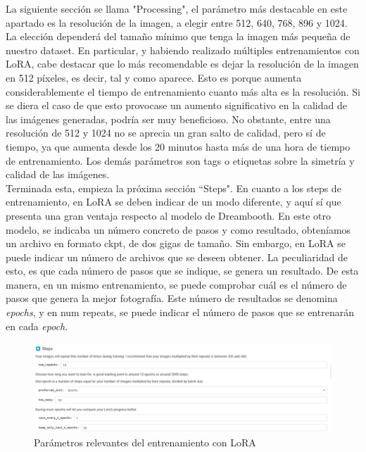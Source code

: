 La siguiente sección se llama "Processing", el parámetro más destacable en este apartado es la resolución de la imagen, a elegir entre 512, 640, 768, 896 y 1024. La elección dependerá del tamaño mínimo que tenga la imagen más pequeña de nuestro dataset.  En particular, y habiendo realizado múltiples entrenamientos con LoRA, cabe destacar que lo más recomendable es dejar la resolución de la imagen en 512 píxeles, es decir, tal y como aparece. Esto es porque aumenta considerablemente el tiempo de entrenamiento cuanto más alta es la resolución. Si se diera el caso de que esto provocase un aumento significativo en la calidad de las imágenes generadas, podría ser muy beneficioso. No obstante, entre una resolución de 512 y 1024 no se aprecia un gran salto de calidad, pero sí de tiempo, ya que aumenta desde los 20 minutos hasta más de una hora de tiempo de entrenamiento. Los demás parámetros son tags o etiquetas sobre la simetría y calidad de las imágenes. \\

Terminada esta, empieza la próxima sección ``Steps".
En cuanto a los steps de entrenamiento, en LoRA se deben indicar de un modo diferente, y aquí sí que presenta una gran ventaja respecto al modelo de Dreambooth. En este otro modelo, se indicaba un número concreto de pasos y como resultado, obteníamos un archivo en formato ckpt, de dos gigas de tamaño. Sin embargo, en LoRA se puede indicar un número de archivos que se deseen obtener. La peculiaridad de esto, es que cada número de pasos que se indique, se genera un resultado. De esta manera, en un mismo entrenamiento, se puede comprobar cuál es el número de pasos que genera la mejor fotografía. Este número de resultados se denomina \textit{epochs}, y en num repeats, se puede indicar el número de pasos que se entrenarán en cada \textit{epoch}. \\

\begin{figure}[h]
	\centering
	\includegraphics[width = 1.2
	\textwidth]{Imagenes/Vectorial/lora.png}
	\caption{Parámetros relevantes del entrenamiento con LoRA}
	\label{fig:lora}
\end{figure}

